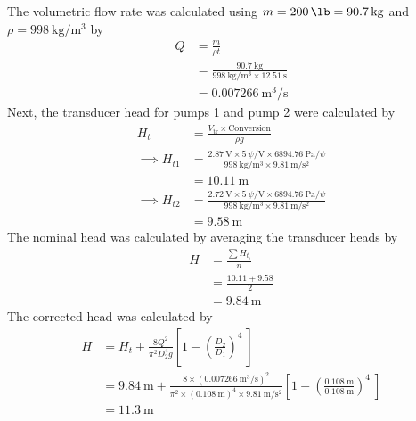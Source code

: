 The volumetric flow rate was calculated using $m = \qty{200}{\lb} = \qty{90.7}{\kilo\gram}$ and $\rho = \qty{998}{\kilo\gram\per\meter\cubed}$ by
\begin{align*}
    Q &= \frac{m}{\rho t} \\
    &= \frac{\qty{90.7}{\kilo\gram}}{\qty{998}{\kilo\gram\per\meter\cubed} \times \qty{12.51}{\second}} \\
    &= \qty{0.007266}{\meter\cubed\per\second}
\end{align*}
Next, the transducer head for pumps 1 and pump 2 were calculated by
\begin{align*}
    H_{t} &= \frac{V_{\text{tr}} \times \text{Conversion}}{\rho g} \\
    \implies H_{t1} &= \frac{\qty{2.87}{\volt} \times \qty{5}{\psi\per\volt} \times \qty{6894.76}{\pascal\per\psi}}{\qty{998}{\kilo\gram\per\meter\cubed} \times \qty{9.81}{\meter\per\second\squared}} \\
    &= \qty{10.11}{\meter} \\
    \implies H_{t2} &= \frac{\qty{2.72}{\volt} \times \qty{5}{\psi\per\volt} \times \qty{6894.76}{\pascal\per\psi}}{\qty{998}{\kilo\gram\per\meter\cubed} \times \qty{9.81}{\meter\per\second\squared}} \\
    &= \qty{9.58}{\meter}
\end{align*}
The nominal head was calculated by averaging the transducer heads by
\begin{align*}
    H &= \frac{\sum H_{t_i}}{n} \\
    &= \frac{10.11 + 9.58}{2} \\
    &= \qty{9.84}{\meter}
\end{align*}
The corrected head was calculated by
\begin{align*}
    H &= H_t + \frac{8Q^2}{\pi^2 D_2^4 g} \left[1 - \left(\frac{D_2}{D_1}\right)^4\ \right] \\
    &= \qty{9.84}{\meter} + \frac{8 \times (\qty{0.007266}{\meter\cubed\per\second})^2}{\pi^2 \times (\qty{0.108}{\meter})^4 \times \qty{9.81}{\meter\per\second\squared}} \left[1 - \left(\frac{\qty{0.108}{\meter}}{\qty{0.108}{\meter}}\right)^4\ \right] \\
    &= \qty{11.3}{\meter}
\end{align*}

